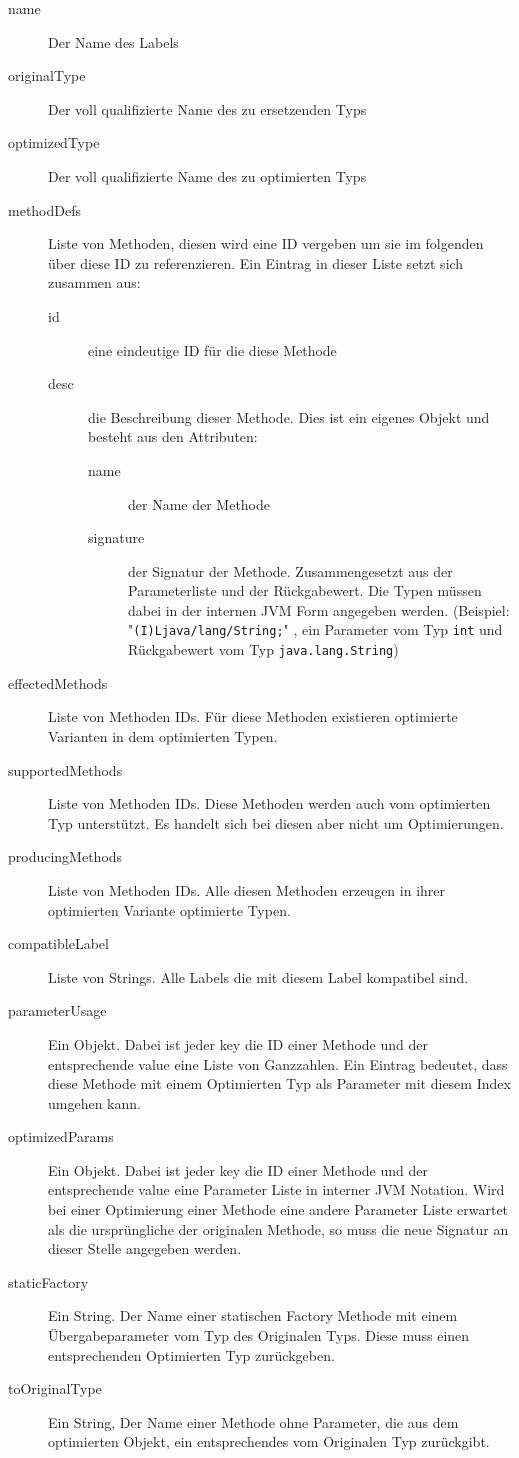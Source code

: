\begin{description}
	\item[name] Der Name des Labels
	\item[originalType] Der voll qualifizierte Name des zu ersetzenden Typs
	\item[optimizedType] Der voll qualifizierte Name des zu optimierten Typs
	\item[methodDefs] Liste von Methoden, diesen wird eine ID vergeben um sie im 
	folgenden über diese ID zu referenzieren. Ein Eintrag in dieser Liste setzt
	sich zusammen aus:
	\begin{description}
		\item[id] eine eindeutige ID für die diese Methode
		\item[desc] die Beschreibung dieser Methode. Dies ist ein eigenes Objekt 
		und besteht aus den Attributen:
		\begin{description}
			\item[name] der Name der Methode
			\item[signature] der Signatur der Methode. Zusammengesetzt aus der
			Parameterliste und der Rückgabewert. Die Typen müssen dabei in der 
			internen JVM Form angegeben werden. (Beispiel: "\texttt{(I)Ljava/lang/String;}"
			, ein Parameter vom Typ \texttt{int} und Rückgabewert vom Typ
			\texttt{java.lang.String})
		\end{description}	
	\end{description}
	\item[effectedMethods] Liste von Methoden IDs. Für diese Methoden existieren 
	optimierte Varianten in dem optimierten Typen.
	\item[supportedMethods] Liste von Methoden IDs. Diese Methoden werden auch vom
	optimierten Typ unterstützt. Es handelt sich bei diesen aber nicht um Optimierungen.
	\item[producingMethods] Liste von Methoden IDs. Alle diesen Methoden erzeugen 
	in ihrer optimierten Variante optimierte Typen.
	\item[compatibleLabel] Liste von Strings. Alle Labels die mit diesem Label
	kompatibel sind.
	\item[parameterUsage] Ein Objekt. Dabei ist jeder key die ID einer Methode 
	und der entsprechende value eine Liste von Ganzzahlen. Ein Eintrag bedeutet, 
	dass diese Methode mit einem Optimierten Typ als Parameter mit diesem Index 
	umgehen kann. 
	\item[optimizedParams] Ein Objekt. Dabei ist jeder key die ID einer Methode 
	und der entsprechende value eine Parameter Liste in interner JVM Notation. 
	Wird bei einer Optimierung einer Methode eine andere Parameter Liste erwartet
	als die ursprüngliche der originalen Methode, so muss die neue Signatur an dieser
	Stelle angegeben werden.
	\item[staticFactory] Ein String. Der Name einer statischen Factory Methode mit 
	einem Übergabeparameter vom Typ des Originalen Typs. Diese muss einen entsprechenden
	Optimierten Typ zurückgeben.
	\item[toOriginalType] Ein String, Der Name einer Methode ohne Parameter, die
	aus dem optimierten Objekt, ein entsprechendes vom Originalen Typ zurückgibt.


\end{description}
